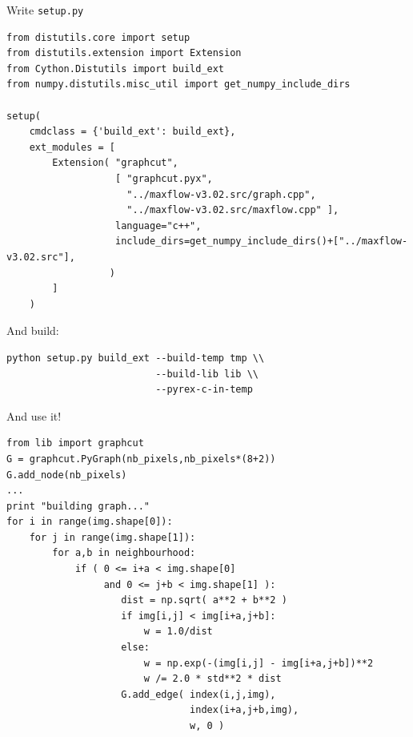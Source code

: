 \documentclass[12pt]{beamer}
\begin{document}
\begin{frame}[fragile]{Write \texttt{setup.py}}
\scriptsize
\begin{verbatim}
from distutils.core import setup
from distutils.extension import Extension
from Cython.Distutils import build_ext
from numpy.distutils.misc_util import get_numpy_include_dirs

setup(
    cmdclass = {'build_ext': build_ext},
    ext_modules = [
        Extension( "graphcut", 
                   [ "graphcut.pyx",
                     "../maxflow-v3.02.src/graph.cpp",
                     "../maxflow-v3.02.src/maxflow.cpp" ],
                   language="c++",
                   include_dirs=get_numpy_include_dirs()+["../maxflow-v3.02.src"],
                  )
        ]
    )
\end{verbatim}

\small

And build:
\begin{verbatim}
python setup.py build_ext --build-temp tmp \\
                          --build-lib lib \\
                          --pyrex-c-in-temp
\end{verbatim}
\end{frame}

\begin{frame}[fragile]{And use it!}
\footnotesize
\begin{verbatim}
from lib import graphcut
G = graphcut.PyGraph(nb_pixels,nb_pixels*(8+2))
G.add_node(nb_pixels)
...
print "building graph..."     
for i in range(img.shape[0]):
    for j in range(img.shape[1]):
        for a,b in neighbourhood:
            if ( 0 <= i+a < img.shape[0]
                 and 0 <= j+b < img.shape[1] ):
                    dist = np.sqrt( a**2 + b**2 )
                    if img[i,j] < img[i+a,j+b]:
                        w = 1.0/dist
                    else:
                        w = np.exp(-(img[i,j] - img[i+a,j+b])**2
                        w /= 2.0 * std**2 * dist
                    G.add_edge( index(i,j,img),
                                index(i+a,j+b,img),
                                w, 0 )
\end{verbatim}
\end{frame}
\end{document}
